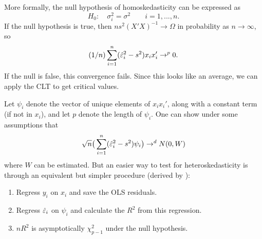 \begin{itemize}[leftmargin=0pt]
  More formally, the null hypothesis of homoskedasticity can be
  expressed as
  \begin{equation*}
    H_0: \quad \sigma^2_i = \sigma^2 \qquad i = 1,...,n.
  \end{equation*}
  If the null hypothesis is true, then $n s^2 (X'X)^{-1} \to \Omega$
  in probability as $n \to \infty$,
  so
  \begin{equation*}
    (1/n) \sum_{i=1}^n (\hat{\varepsilon}^2_i - s^2) x_i x_i' \to^p 0.
  \end{equation*}
  If the null is false, this convergence fails.  Since this looks like
  an average, we can apply the CLT to get critical values.

  Let $\psi_i$ denote the vector of unique elements of $x_ix_i'$, along
  with a constant term (if not in $x_i$), and let $p$ denote the
  length of $\psi_i$.  One can show under some assumptions that
  \begin{equation*}
    \sqrt{n} \big( \sum_{i=1}^n (\hat{\varepsilon}^2_i - s^2) \psi_i \big) \to^d N(0, W)
  \end{equation*}
  where $W$ can be estimated.  But an easier way to test for
  heteroskedasticity is through an equivalent but simpler procedure
  (derived by \citealp{Whi80}):
  
  \begin{enumerate}
  \item Regress $y_i$ on $x_i$ and save the OLS residuals.
  \item Regress $\hat{\varepsilon}_i$ on $\psi_i$ and calculate the $R^2$
    from this regression.
  \item $n R^2$ is asymptotically $\chi^2_{p-1}$ under the null
    hypothesis.
  \end{enumerate}

\end{itemize}

